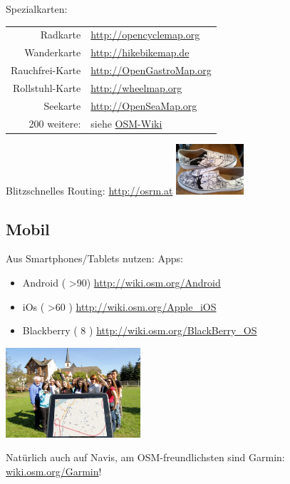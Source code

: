 \documentclass{beamer}
\begin{document}
\begin{frame}{Spezialkarten:}


  \begin{table}[htbp]
    \centering
    \begin{tabular}{r|l}
      Radkarte  &  \url{http://opencyclemap.org} \\
      Wanderkarte & \url{http://hikebikemap.de} \\
      Rauchfrei-Karte & \url{http://OpenGastroMap.org} \\
      Rollstuhl-Karte & \url{http://wheelmap.org} \\
      Seekarte & \url{http://OpenSeaMap.org} \\
      200 weitere: & siehe \href{http://wiki.openstreetmap.org/wiki/List\_of\_OSM\_based\_Services}{OSM-Wiki} \\
    \end{tabular}
  \end{table}

  Blitzschnelles Routing: \url{http://osrm.at} \hspace{1cm} \includegraphics[width=2.5cm]{shoes.jpg}

\end{frame}

\subsection{Mobil}
\begin{frame}{Aus Smartphones/Tablets nutzen:}
	Apps:
 
 \begin{itemize}
   \item  Android ( \textgreater 90) \url{http://wiki.osm.org/Android}
   \item  iOs ( \textgreater 60 )  \url{http://wiki.osm.org/Apple\_iOS}
   \item  Blackberry ( 8 ) \url{http://wiki.osm.org/BlackBerry\_OS}
 \end{itemize}
 
 \begin{center}
 \includegraphics[width=5cm]{tablet.jpg}
 \end{center}

 Natürlich auch auf Navis, am OSM-freundlichsten sind Garmin: \href{http://wiki.osm.org/Garmin}{wiki.osm.org/Garmin}!

\end{frame}
\end{document}
